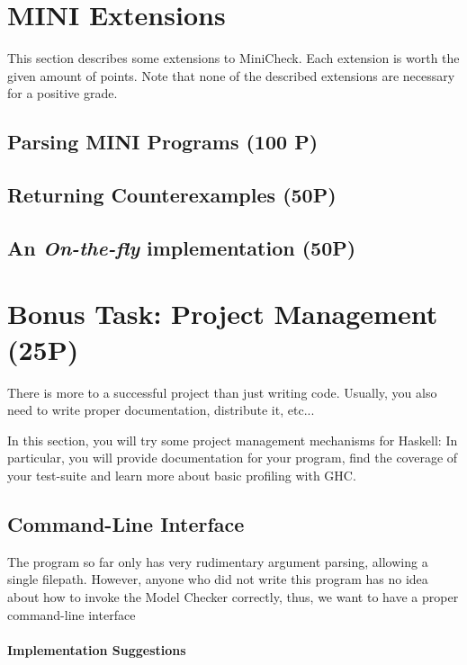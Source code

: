 \documentclass{article}
\begin{document}
\section{MINI Extensions}
This section describes some extensions to MiniCheck. Each extension is worth the given amount of points. 
Note that none of the described extensions are necessary for a positive grade.

\subsection{Parsing MINI Programs (100 P)}

\subsection{Returning Counterexamples (50P)}

\subsection{An \textit{On-the-fly} implementation (50P)}

\section{Bonus Task: Project Management (25P)}

There is more to a successful project than just writing code. Usually, you also need to write proper documentation, distribute it, etc...

In this section, you will try some project management mechanisms for Haskell: In particular, you will provide documentation for your program, 
find the coverage of your test-suite and learn more about basic profiling with GHC.

\subsection{Command-Line Interface}

The program so far only has very rudimentary argument parsing, allowing a single filepath.
However, anyone who did not write this program has no idea about how to invoke the Model Checker correctly,
thus, we want to have a proper command-line interface

\paragraph{Implementation Suggestions}
\end{document}
